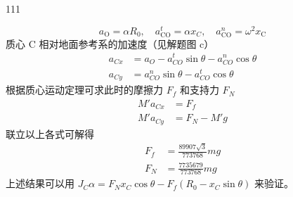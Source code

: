 \begin{solution}{111}
\begin{subsolution}
        \begin{equation}
            a_{\mathrm{O}} = \alpha R_{0}, \quad a_{\mathrm{CO}}^{t} = \alpha x_{C}, \quad a_{\mathrm{CO}}^{n} = \omega^{2} x_{\mathrm{C}}
            \label{eq:13.s111}
        \end{equation}
        质心 C 相对地面参考系的加速度（见解题图 c）
        \begin{align}
            a_{Cx} &= a_{O} - a_{CO}^{t}\sin\theta - a_{CO}^{n}\cos\theta \\
            a_{Cy} &= a_{CO}^{n}\sin\theta - a_{CO}^{t}\cos\theta
            \label{eq:14.s111}
        \end{align}
        根据质心运动定理可求此时的摩擦力 $F_{f}$ 和支持力 $F_{N}$
        \begin{equation}
            \begin{aligned}
                M' a_{Cx} &= F_{f} \\
                M' a_{Cy} &= F_{N} - M' g
            \end{aligned}
            \label{eq:15.s111}
        \end{equation}
        联立以上各式可解得
        \begin{equation}
            \begin{aligned}
                F_{f} &= \frac{89907 \sqrt{3}}{773768} m g \\
                F_{N} &= \frac{7735679}{773768} m g
            \end{aligned}
            \label{eq:16.s111}
        \end{equation}
        上述结果可以用 $J_{C}\alpha = F_{N}x_{C}\cos\theta -F_{f}(R_{0} - x_{C}\sin\theta)$ 来验证。
    \end{subsolution}
\end{solution}